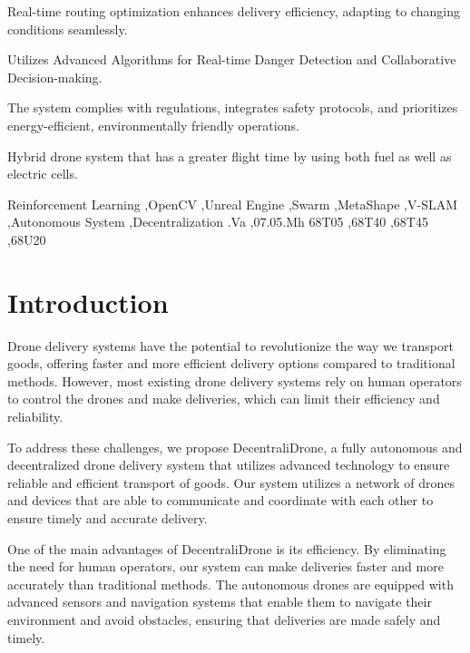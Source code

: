\documentclass[preprint,12pt]{elsarticle}
\begin{document}
\begin{frontmatter}
\begin{highlights}
\item Real-time routing optimization enhances delivery efficiency, adapting to changing conditions seamlessly.

\item Utilizes Advanced Algorithms for Real-time Danger Detection and Collaborative Decision-making.

\item The system complies with regulations, integrates safety protocols, and prioritizes energy-efficient, environmentally friendly operations.

\item Hybrid drone system that has a greater flight time by using both fuel as well as electric cells.

\end{highlights}

\begin{keyword}
Reinforcement Learning \sep OpenCV \sep Unreal Engine \sep Swarm \sep MetaShape \sep V-SLAM \sep Autonomous System \sep Decentralization
.Va \sep 07.05.Mh 
\MSC 68T05 \sep 68T40 \sep 68T45 \sep 68U20
\end{keyword}

\end{frontmatter}

\section{Introduction}
Drone delivery systems have the potential to revolutionize the way we transport goods, offering faster and more efficient delivery options compared to traditional methods. However, most existing drone delivery systems rely on human operators to control the drones and make deliveries, which can limit their efficiency and reliability.

To address these challenges, we propose DecentraliDrone, a fully autonomous and decentralized drone delivery system that utilizes advanced technology to ensure reliable and efficient transport of goods. Our system utilizes a network of drones and devices that are able to communicate and coordinate with each other to ensure timely and accurate delivery.

One of the main advantages of DecentraliDrone is its efficiency. By eliminating the need for human operators, our system can make deliveries faster and more accurately than traditional methods. The autonomous drones are equipped with advanced sensors and navigation systems that enable them to navigate their environment and avoid obstacles, ensuring that deliveries are made safely and timely.
\end{document}
